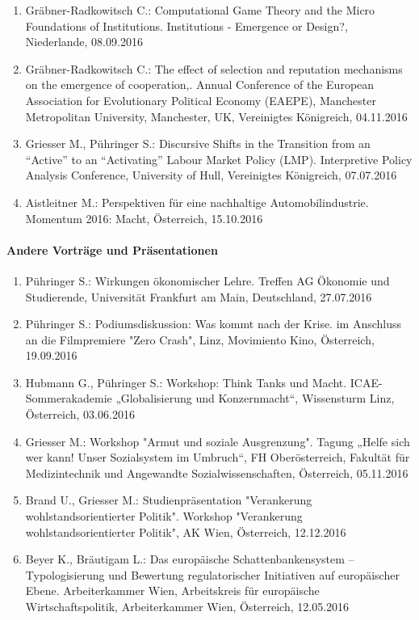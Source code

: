 \begin{enumerate}
	\item Gräbner-Radkowitsch C.: Computational Game Theory and the Micro Foundations of Institutions. Institutions - Emergence or Design?, Niederlande, 08.09.2016
	\item Gräbner-Radkowitsch C.: The effect of selection and reputation mechanisms on the emergence of cooperation,. Annual Conference of the European Association for Evolutionary Political Economy (EAEPE), Manchester Metropolitan University, Manchester, UK, Vereinigtes Königreich, 04.11.2016
	\item Griesser M., Pühringer S.: Discursive Shifts in the Transition from an “Active” to an “Activating” Labour Market Policy (LMP). Interpretive Policy Analysis Conference, University of Hull, Vereinigtes Königreich, 07.07.2016
	\item Aistleitner M.: Perspektiven für eine nachhaltige Automobilindustrie. Momentum 2016: Macht, Österreich, 15.10.2016
\end{enumerate}
\paragraph{Andere Vorträge und Präsentationen}
\begin{enumerate}
	\item Pühringer S.: Wirkungen ökonomischer Lehre. Treffen AG Ökonomie und Studierende, Universität Frankfurt am Main, Deutschland, 27.07.2016
	\item Pühringer S.: Podiumsdiskussion: Was kommt nach der Krise. im Anschluss an die Filmpremiere "Zero Crash", Linz, Movimiento Kino, Österreich, 19.09.2016
	\item Hubmann G., Pühringer S.: Workshop: Think Tanks und Macht. ICAE-Sommerakademie „Globalisierung und Konzernmacht“, Wissensturm Linz, Österreich, 03.06.2016
	\item Griesser M.: Workshop "Armut und soziale Ausgrenzung". Tagung „Helfe sich wer kann! Unser Sozialsystem im Umbruch“, FH Oberösterreich, Fakultät für Medizintechnik und Angewandte Sozialwissenschaften, Österreich, 05.11.2016
	\item Brand U., Griesser M.: Studienpräsentation "Verankerung wohlstandsorientierter Politik". Workshop "Verankerung wohlstandsorientierter Politik", AK Wien, Österreich, 12.12.2016
	\item Beyer K., Bräutigam L.: Das europäische Schattenbankensystem – Typologisierung und Bewertung regulatorischer Initiativen auf europäischer Ebene. Arbeiterkammer Wien, Arbeitskreis für europäische Wirtschaftspolitik, Arbeiterkammer Wien, Österreich, 12.05.2016
\end{enumerate}
